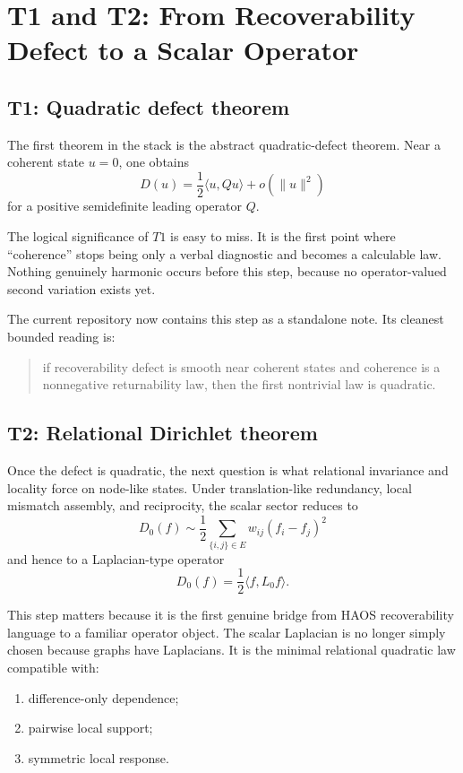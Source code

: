 \documentclass[11pt]{article}
\begin{document}
\section{T1 and T2: From Recoverability Defect to a Scalar Operator}

\subsection{T1: Quadratic defect theorem}

The first theorem in the stack is the abstract quadratic-defect theorem. Near a coherent state $u=0$, one obtains
\[
D(u) = \frac{1}{2}\langle u,Qu\rangle + o(\|u\|^2)
\]
for a positive semidefinite leading operator $Q$.

The logical significance of $T1$ is easy to miss. It is the first point where ``coherence'' stops being only a verbal diagnostic and becomes a calculable law. Nothing genuinely harmonic occurs before this step, because no operator-valued second variation exists yet.

The current repository now contains this step as a standalone note. Its cleanest bounded reading is:
\begin{quote}
if recoverability defect is smooth near coherent states and coherence is a nonnegative returnability law, then the first nontrivial law is quadratic.
\end{quote}

\subsection{T2: Relational Dirichlet theorem}

Once the defect is quadratic, the next question is what relational invariance and locality force on node-like states. Under translation-like redundancy, local mismatch assembly, and reciprocity, the scalar sector reduces to
\[
D_0(f) \sim \frac{1}{2}\sum_{\{i,j\}\in E} w_{ij}(f_i-f_j)^2
\]
and hence to a Laplacian-type operator
\[
D_0(f) = \frac{1}{2}\langle f,L_0 f\rangle.
\]

This step matters because it is the first genuine bridge from HAOS recoverability language to a familiar operator object. The scalar Laplacian is no longer simply chosen because graphs have Laplacians. It is the minimal relational quadratic law compatible with:
\begin{enumerate}
\item difference-only dependence;
\item pairwise local support;
\item symmetric local response.
\end{enumerate}
\end{document}
